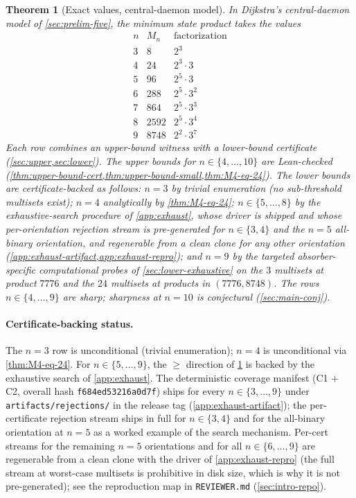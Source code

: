 \documentclass[11pt,a4paper]{article}
\theoremstyle{plain}
\newtheorem{theorem}{Theorem}
\theoremstyle{definition}
\newcommand{\Mn}{M_n}
\begin{document}
\begin{theorem}[Exact values, central-daemon model]\label{thm:exact-values}
In Dijkstra's central-daemon model of \cref{sec:prelim-five}, the
minimum state product takes the values
\[
\begin{array}{c|c|l}
n & \Mn & \text{factorization}\\\hline
3 & 8     & 2^3\\
4 & 24    & 2^3 \cdot 3\\
5 & 96    & 2^5 \cdot 3\\
6 & 288   & 2^5 \cdot 3^2\\
7 & 864   & 2^5 \cdot 3^3\\
8 & 2592  & 2^5 \cdot 3^4\\
9 & 8748  & 2^2 \cdot 3^7
\end{array}
\]
Each row combines an upper-bound witness with a lower-bound
certificate (\cref{sec:upper,sec:lower}).  The upper bounds for
$n \in \{4, \ldots, 10\}$ are Lean-checked
(\cref{thm:upper-bound-cert,thm:upper-bound-small,thm:M4-eq-24}).
The lower bounds are certificate-backed as follows: $n = 3$ by
trivial enumeration (no sub-threshold multisets exist); $n = 4$
analytically by \cref{thm:M4-eq-24}; $n \in \{5, \ldots, 8\}$ by
the exhaustive-search procedure of \cref{app:exhaust}, whose
driver is shipped and whose per-orientation rejection stream is
pre-generated for $n \in \{3, 4\}$ and the $n = 5$ all-binary
orientation, and regenerable from a clean clone for any other
orientation (\cref{app:exhaust-artifact,app:exhaust-repro}); and
$n = 9$ by the targeted absorber-specific computational
probes of \cref{sec:lower-exhaustive} on the $3$ multisets at
product $7776$ and the $24$ multisets at products in
$(7776, 8748)$.  The rows $n \in \{4, \ldots, 9\}$ are sharp;
sharpness at $n = 10$ is conjectural (\cref{sec:main-conj}).
\end{theorem}

\paragraph{Certificate-backing status.} The $n = 3$ row is
unconditional (trivial enumeration); $n = 4$ is unconditional via
\cref{thm:M4-eq-24}.  For $n \in \{5, \ldots, 9\}$, the $\ge$
direction of \cref{thm:exact-values} is backed by the exhaustive
search of \cref{app:exhaust}.  The deterministic coverage manifest
(C1 + C2, overall hash \texttt{f684ed53216a0d7f}) ships for every
$n \in \{3, \ldots, 9\}$ under \texttt{artifacts/rejections/} in
the release tag (\cref{app:exhaust-artifact}); the
per-certificate rejection stream ships in full for
$n \in \{3, 4\}$ and for the all-binary orientation at $n = 5$
as a worked example of the search mechanism.  Per-cert streams
for the remaining $n = 5$ orientations and for all
$n \in \{6, \ldots, 9\}$ are regenerable from a clean clone with
the driver of \cref{app:exhaust-repro} (the full stream at
worst-case multisets is prohibitive in disk size, which is why
it is not pre-generated); see the reproduction map in
\texttt{REVIEWER.md} (\cref{sec:intro-repo}).
\end{document}
